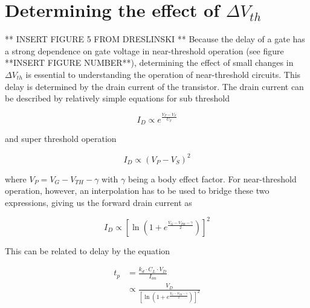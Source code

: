 \section{Determining the effect of $\Delta V_{th}$}
** INSERT FIGURE 5 FROM DRESLINSKI **
Because the delay of a gate has a strong dependence on gate voltage in near-threshold operation (see figure **INSERT FIGURE NUMBER**), determining the effect of small changes in $\Delta V_{th}$ is essential to understanding the operation of near-threshold circuits.
This delay is determined by the drain current of the transistor.
The drain current can be described by relatively simple equations for sub threshold \cite{Enz:1995vs} 

\begin{equation}
I_D \propto e^\frac{V_P-V_S}{U_T}
\end{equation}

and super threshold operation

\begin{equation}
I_D \propto (V_P-V_S)^2
\end{equation}

where $V_P=V_G-V_{TH}-\gamma$ with $\gamma$ being a body effect factor. 
For near-threshold operation, however, an interpolation has to be used to bridge these two expressions\cite{Enz:1995vs}, giving us the forward drain current as

\begin{equation}
I_D \propto \left[\ln\left(1+e^\frac{V_G-V_{TH}-\gamma}{2}\right)\right]^2
\end{equation}

This can be related to delay by the equation \cite{Hanson:2007uu}

\begin{align}
t_p &= \frac{k_d\cdot C_L\cdot V_D}{I_{on}}\\
&\propto\frac{V_D}{\left[\ln\left(1+e^\frac{V_G-V_{TH}-\gamma}{2}\right)\right]^2}
\end{align}
 
 